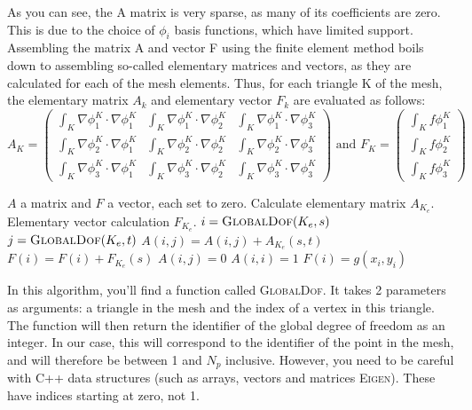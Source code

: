 \documentclass[11pt,a4paper]{article}
\begin{document}
As you can see, the A matrix is very sparse, as many of its coefficients are zero.
This is due to the choice of $\phi_i$ basis functions, which have limited support.
Assembling the matrix A and vector F using the finite element method boils down to assembling so-called elementary matrices and vectors, as they are calculated for each of the mesh elements. 
Thus, for each triangle K of the mesh, the elementary matrix $A_k$ and elementary vector $F_k$ are evaluated as follows:
\begin{equation*}
A_K = \left(
  \begin{matrix}
    \displaystyle \int_K \nabla \phi_1^K \cdot \nabla \phi_1^K & \displaystyle \int_K \nabla \phi_1^K \cdot \nabla \phi_2^K & \displaystyle \int_K \nabla \phi_1^K \cdot \nabla \phi_3^K \\
    \displaystyle \int_K \nabla \phi_2^K \cdot \nabla \phi_1^K & \displaystyle \int_K \nabla \phi_2^K \cdot \nabla \phi_2^K & \displaystyle \int_K \nabla \phi_2^K \cdot \nabla \phi_3^K \\
    \displaystyle \int_K \nabla \phi_3^K \cdot \nabla \phi_1^K & \displaystyle \int_K \nabla \phi_3^K \cdot \nabla \phi_2^K & \displaystyle \int_K \nabla \phi_3^K \cdot \nabla \phi_3^K
  \end{matrix}
  \right)
  \text{ and }
  F_K = \left(
  \begin{matrix}
    \displaystyle \int_K f \phi_1^K \\
    \displaystyle \int_K f \phi_2^K \\
    \displaystyle \int_K f \phi_3^K
  \end{matrix}
  \right)
\end{equation*}




\begin{algorithmic}[1]
  \Require $A$ a matrix and $F$ a vector, each set to zero.
  \State Calculate elementary matrix $A_{K_e}$.
  \State Elementary vector calculation $F_{K_e}$.
  \State $i = \Call{GlobalDof}{K_e,s}$
  \State $j = \Call{GlobalDof}{K_e,t}$
  \State $A(i,j) = A(i,j) + A_{K_e}(s,t)$
  \EndFor
  \State $F(i) = F(i) + F_{K_e}(s)$
  \EndFor
  \EndFor
  \State $A(i,j)=0$
  \EndFor
  \State $A(i,i)=1$
  \State $F(i)=g(x_i,y_i)$
  \EndFor
\end{algorithmic}

In this algorithm, you'll find a function called \textsc{GlobalDof}. It takes 2 parameters as arguments: a triangle in the mesh and the index of a vertex in this triangle.
The function will then return the identifier of the global degree of freedom as an integer.
In our case, this will correspond to the identifier of the point in the mesh, and will therefore be between 1 and $N_p$ inclusive.
However, you need to be careful with C++ data structures (such as arrays, vectors and matrices \textsc{Eigen}). These have indices starting at zero, not 1.
\end{document}

